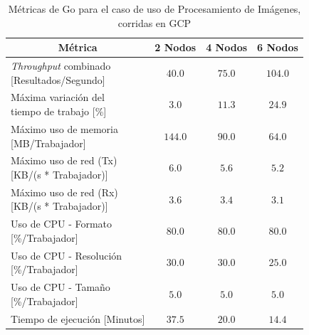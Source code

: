 \documentclass[11pt]{article}
\providecommand{\row}[1]{\parbox{150pt}{\setlength{\baselineskip}{0.2\baselineskip}\strut#1\strut}}
\newcommand{\ipcap}[2]{\caption{Métricas de #1 para el caso de uso de Procesamiento de Imágenes, corridas en #2}}
\newcommand{\english}[1]{\textit{#1}}
\begin{document}
\begin{table}[H]
\centering
\begin{tabular}{|l|c|c|c|}
\hline
\multicolumn{1}{|c|}{Métrica} & 2 Nodos & 4 Nodos & 6 Nodos \\ \hline
\row{\english{Throughput} combinado\\{[Resultados/Segundo]}} & $40.0$ & $75.0$ & $104.0$ \\ \hline
\row{Máxima variación del \\ tiempo de trabajo {[}\%{]}} & $3.0$ & $11.3$ & $24.9$ \\ \hline
\row{Máximo uso de memoria \\ {[MB/Trabajador]}} & $144.0$ & $90.0$ & $64.0$ \\ \hline
\row{Máximo uso de red (Tx) \\ {[KB/(s * Trabajador)]}} & $6.0$ & $5.6$ & $5.2$ \\ \hline
\row{Máximo uso de red (Rx) \\ {[KB/(s * Trabajador)]}} & $3.6$ & $3.4$ & $3.1$ \\ \hline
\row{Uso de CPU - Formato\\{[\%/Trabajador]}} & $80.0$ & $80.0$ & $80.0$ \\ \hline
\row{Uso de CPU - Resolución\\{[\%/Trabajador]}} & $30.0$ & $30.0$ & $25.0$ \\ \hline
\row{Uso de CPU - Tamaño\\{[\%/Trabajador]}} & $5.0$ & $5.0$ & $5.0$ \\ \hline
Tiempo de ejecución [Minutos] & $37.5$ & $20.0$ & $14.4$ \\ \hline
\end{tabular}
\ipcap{Go}{GCP}
\end{table}
\end{document}
